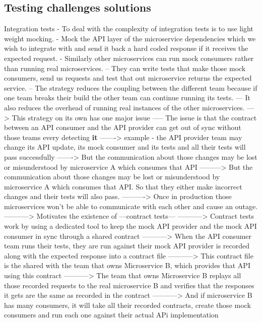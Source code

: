 \documentclass[a4paper, 11pt]{book}
\begin{document}
    \subsection{Testing challenges solutions}
    Integration tests
    - To deal with the complexity of integration tests is to use light weight mocking.
    - Mock the API layer of the microservice dependencies which we wish to integrate with and send it back a hard coded response if it receives the expected request.
    - Similarly other microservices can run mock consumers rather than running real microservices.
    -- They can write tests that make those mock consumers, send us requests and test that out microservice returns the expected service.
    -- The strategy reduces the coupling between the different team because if one team breaks their build the other team can continue running its tests.
    --- It also reduces the overhead of running real instances of the other microservices.
    ---> This strategy on its own has one major issue
    ----- The issue is that the contract between an API consumer and the API provider can get out of sync without those teams every detecting \textbf{it}
    -------> example - the API provider team may change its API update, its mock consumer and its tests and all their tests will pass successfully
    -------> But the communication about those changes may be lost or misunderstood by microservice A which consumes that API
    ---------> But the communication about those changes may be lost or misunderstood by microservice A which consumes that API. So that they either make incorrect changes and their tests will also pass.
    ----------> Once in production those microservices won't be able to communicate with each other and cause an outage.
    -----------> Motivates the existence of ---contract tests---
    -----------> Contract tests work by using a dedicated tool to keep the mock API provider and the mock API consumer in sync through a shared contract
    -----------> When the API consumer team runs their tests, they are run against their mock API provider is recorded along with the expected response into a contract file
    -----------> This contract file is the shared with the team that owns Microservice B, which provides that API using this contract
    -----------> The team that owns Microservice B replays all those recorded requests to the real microservice B and verifies that the responses it gets are the same as recorded in the contract
    -----------> And if microservice B has many consumers, it will take all their recorded contracts, create those mock consumers and run each one against their actual APi implementation
\end{document}
